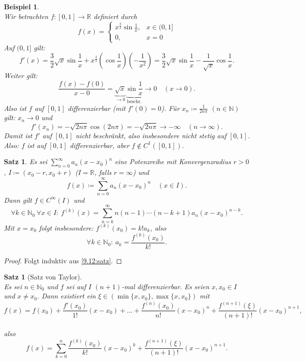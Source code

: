 \documentclass[12pt]{extreport} %
\newcommand{\N}{\mathbb{N}}
\newcommand{\R}{\mathbb{R}}
\theoremstyle{named}
\theoremstyle{itshape}
\newtheorem{satz}[unnamedtheorem]{Satz}
\theoremstyle{normal}
\newtheorem{beispiel}[unnamedtheorem]{Beispiel}
\begin{document}
{\begin{beispiel} \label{9.18:bsp} ~\\
	Wir betrachten $f:[0,1] \to \R$ definiert durch 
	$$f(x) = \begin{cases} x^{\frac{3}{2}} \sin \frac{1}{x}, & x \in (0, 1] \\0, & x = 0 \end{cases}$$
	Auf $(0, 1]$ gilt: 
	$$ f'(x) = \frac{3}{2} \sqrt{x} \sin \frac{1}{x} + x^{\frac{3}{2}} (\cos \frac{1}{x}) (-\frac{1}{x^{2}})
	= \frac{3}{2} \sqrt{x} \sin \frac{1}{x} -  \frac{1}{\sqrt{x}} \cos \frac{1}{x}.$$
	Weiter gilt:
	$$ \frac{f(x) - f(0)}{x - 0} = \underbrace{\sqrt{x}}_{\rightarrow 0} \underbrace{\sin \frac{1}{x}}_{\text{beschr.}} \rightarrow 0 \quad (x \to 0).$$
	Also ist $f$ auf $[0, 1]$ differenzierbar (mit $f'(0) = 0$). Für $x_{n} \coloneqq \frac{1}{2 n \pi}$ $(n \in \N)$ gilt: $x_{n} \rightarrow 0$ und
		$$ f'(x_{n}) = -\sqrt{2 n \pi} \cos(2 n \pi) = -\sqrt{2 n \pi} \to -\infty \quad (n \to \infty). $$ 
	Damit ist $f'$ auf $[0, 1]$ nicht beschränkt, also insbesondere nicht stetig auf $[0,1]$. \\
	Also: $f$ ist auf $[0, 1]$ differenzierbar, aber $f \notin C^{1}([0, 1])$.
\end{beispiel}


\begin{satz} \label{9.19:satz}
	Es sei $\sum_{n=0}^{\infty} a_{n} (x - x_{0})^{n}$ eine Potenzreihe mit Konvergenzradius $r > 0$, $I \coloneqq (x_{0} - r, x_{0} + r)$ ($I = \R$, falls $r = \infty$) und 
	$$ f(x) \coloneqq \sum_{n=0}^{\infty} a_{n} (x - x_{0})^{n} \quad (x \in I). $$
	Dann gilt $f \in C^{\infty}(I)$ und 
	$$\forall k \in \N_{0} ~ \forall x \in I: ~ f^{(k)}(x) = \sum_{n=k}^{\infty} n(n-1) \cdots (n-k+1) a_{n} (x - x_{0})^{n-k}. $$
	Mit $x = x_{0}$ folgt insbesondere: $f^{(k)}(x_{0}) = k! a_{k}$, also
		$$\forall k \in \N_{0}: ~ a_{k} = \frac{f^{(k)}(x_{0})}{k!}. $$
\end{satz}

\begin{proof}
Folgt induktiv aus \ref{9.12:satz}. 
\end{proof}


\begin{satz}[Satz von Taylor] \label{9.20:satz-Taylor} ~\\
	Es sei $n \in \N_{0}$ und $f$ sei auf $I$ $(n+1)$-mal differenzierbar. Es seien $x, x_{0} \in I$ und $x \neq x_{0}$. Dann existiert ein 
	$\xi \in (\min\{x,x_0\},\max\{x,x_0\}) $ mit
		$$ f(x) = f(x_{0}) + \frac{f'(x_{0})}{1!} (x - x_{0}) + \dotsc + \frac{f^{(n)}(x_{0})}{n!} (x - x_{0})^{n} + \frac{f^{(n+1)}(\xi)}{(n+1)!} (x - x_{0})^{n+1},$$\\also\\ 
			$$f(x) = \sum_{k=0}^{n}\frac{f^{(k)}(x_0)}{k!}(x-x_0)^k+\frac{f^{(n+1)}(\xi)}{(n+1)!}(x-x_0)^{n+1}.$$
\end{satz}

}
\end{document}
